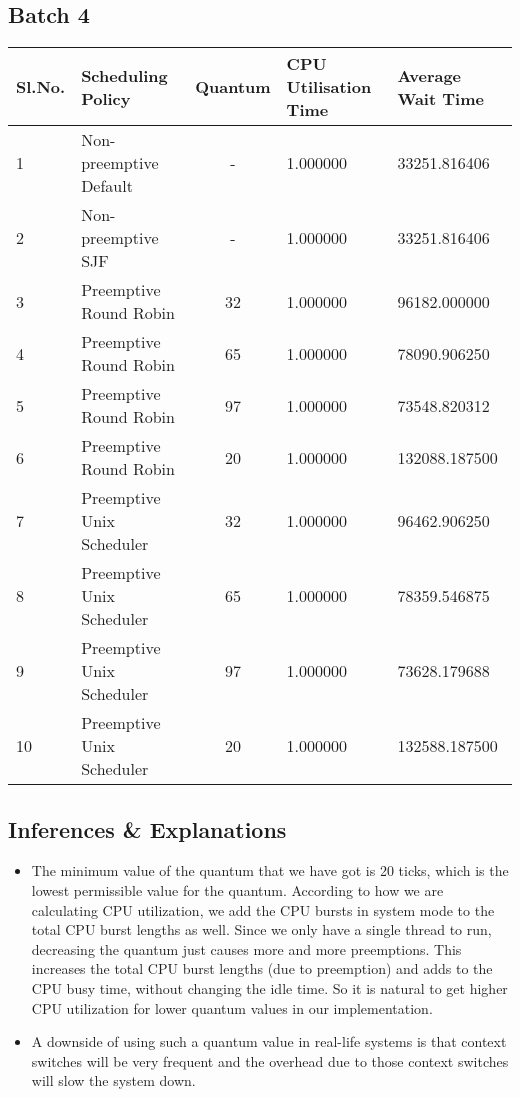 \documentclass{article}
\begin{document}
\subsection{Batch 4}
\begin{center}
    \begin{tabular}{| l | l | c | l | l |}
    \hline
    Sl.No. & Scheduling Policy & Quantum & CPU Utilisation Time & Average Wait Time \\ \hline
    1 & Non-preemptive Default & - & 1.000000 & 33251.816406 \\
    2 & Non-preemptive SJF & - & 1.000000 & 33251.816406 \\
    3 & Preemptive Round Robin & 32 & 1.000000 & 96182.000000 \\
    4 & Preemptive Round Robin & 65 & 1.000000 & 78090.906250 \\
    5 & Preemptive Round Robin & 97 & 1.000000 & 73548.820312 \\
    6 & Preemptive Round Robin & 20 & 1.000000 & 132088.187500 \\
    7 & Preemptive Unix Scheduler & 32 & 1.000000 & 96462.906250 \\
    8 & Preemptive Unix Scheduler & 65 & 1.000000 & 78359.546875 \\
    9 & Preemptive Unix Scheduler & 97 & 1.000000 & 73628.179688 \\
    10 & Preemptive Unix Scheduler & 20 & 1.000000 & 132588.187500 \\
    \hline
    \end{tabular}
\end{center}
\subsection{Inferences \& Explanations}
\begin{itemize}
\item The minimum value of the quantum that we have got is 20 ticks, which is the lowest permissible value for the quantum. According to how we are calculating CPU utilization, we add the CPU bursts in system mode to the total CPU burst lengths as well. Since we only have a single thread to run, decreasing the quantum just causes more and more preemptions. This increases the total CPU burst lengths (due to preemption) and adds to the CPU busy time, without changing the idle time. So it is natural to get higher CPU utilization for lower quantum values in our implementation.
\item A downside of using such a quantum value in real-life systems is that context switches will be very frequent and the overhead due to those context switches will slow the system down.
\end{itemize}
\end{document}
